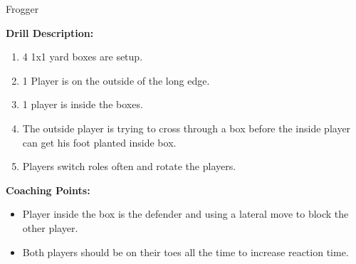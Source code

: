 \begin{evenBlock}{Frogger}

\begin{minipage}[t]{\linewidth}
    \centering
    
    \begin{minipage}{.3\linewidth} %
    \end{minipage}
    \hspace{0.05\linewidth}
    \begin{minipage}{.6\linewidth} %
        \textbf{Drill Description:}
        \begin{enumerate}
        \setlength{\itemsep}{0pt}
        \setlength{\parskip}{0pt}
        \setlength{\parsep}{0pt}
        \item 4 1x1 yard boxes are setup.
        \item 1 Player is on the outside of the long edge.
        \item 1 player is inside the boxes.
        \item The outside player is trying to cross through a box before the inside player can get his foot planted inside box.
        \item Players switch roles often and rotate the players.
        \end{enumerate}

        \vspace{10pt}
        
        \textbf{Coaching Points:}
        \begin{itemize}
        \setlength{\itemsep}{0pt}
        \setlength{\parskip}{0pt}
        \setlength{\parsep}{0pt}
        \item Player inside the box is the defender and using a lateral move to block the other player.
        \item Both players should be on their toes all the time to increase reaction time.
        \end{itemize}

    \end{minipage}
\end{minipage}

\end{evenBlock}